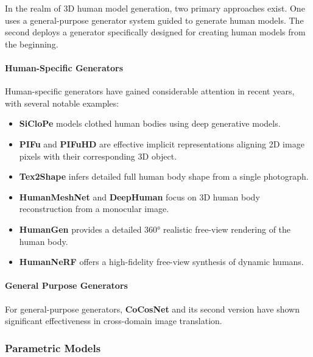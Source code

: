In the realm of 3D human model generation, two primary approaches exist. One
uses a general-purpose generator system guided to generate human models. The
second deploys a generator specifically designed for creating human models from
the beginning.

\paragraph{Human-Specific Generators}

Human-specific generators have gained considerable attention in recent years,
with several notable examples:

\begin{itemize}
	\item \textbf{SiCloPe} \cite{DBLP:journals/corr/abs-1901-00049} models clothed human bodies using deep generative models.
	\item \textbf{PIFu} and \textbf{PIFuHD} \cite{pifu, pifuhd} are effective implicit representations aligning 2D image pixels with their corresponding 3D object.
	\item \textbf{Tex2Shape} \cite{alldieck2019tex2shape} infers detailed full human body shape from a single photograph.
	\item \textbf{HumanMeshNet} \cite{DBLP:journals/corr/abs-1908-06544} and \textbf{DeepHuman} \cite{DBLP:journals/corr/abs-1903-06473} focus on 3D human body reconstruction from a monocular image.
	\item \textbf{HumanGen} \cite{jiang2022humangen} provides a detailed 360° realistic free-view rendering of the human body.
	\item \textbf{HumanNeRF} \cite{weng_humannerf_2022_cvpr} offers a high-fidelity free-view synthesis of dynamic humans.
\end{itemize}

\paragraph{General Purpose Generators}

For general-purpose generators, \textbf{CoCosNet} and its second version
\cite{Zhang_2020_CVPR, Zhou_2021_CVPR} have shown significant effectiveness in
cross-domain image translation.

\subsubsection{Parametric Models}

